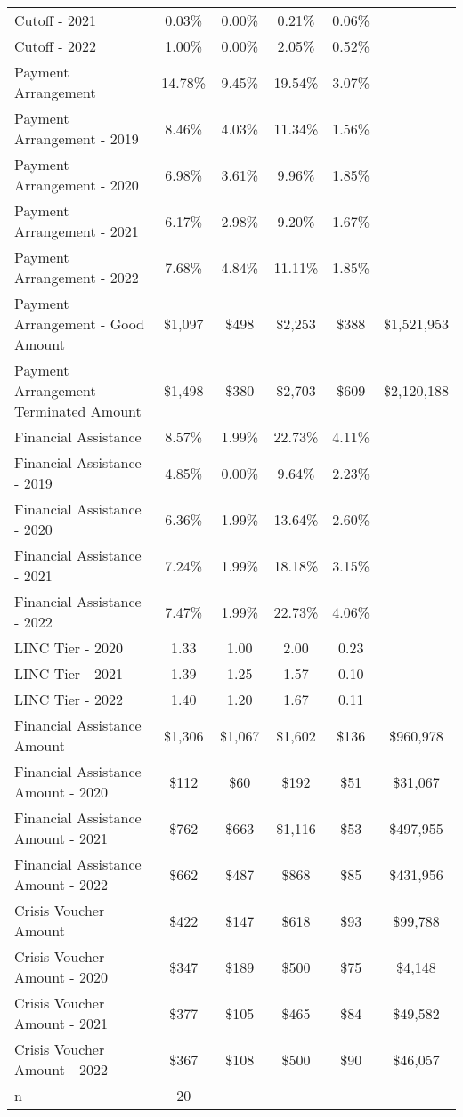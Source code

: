\begin{tabular}{l|c|c|c|c|c}
\quad Cutoff - 2021 & 0.03\% & 0.00\% & 0.21\% & 0.06\% \\
\quad Cutoff - 2022 & 1.00\% & 0.00\% & 2.05\% & 0.52\% \\
\midrule 
Payment Arrangement & 14.78\% & 9.45\% & 19.54\% & 3.07\% \\
\quad Payment Arrangement - 2019 & 8.46\% & 4.03\% & 11.34\% & 1.56\% \\
\quad Payment Arrangement - 2020 & 6.98\% & 3.61\% & 9.96\% & 1.85\% \\
\quad Payment Arrangement - 2021 & 6.17\% & 2.98\% & 9.20\% & 1.67\% \\
\quad Payment Arrangement - 2022 & 7.68\% & 4.84\% & 11.11\% & 1.85\% \\
\quad Payment Arrangement - Good Amount & \$1,097 & \$498 & \$2,253 & \$388 & \$1,521,953 \\
\quad Payment Arrangement - Terminated Amount & \$1,498 & \$380 & \$2,703 & \$609 & \$2,120,188 \\
\midrule 
Financial Assistance & 8.57\% & 1.99\% & 22.73\% & 4.11\% \\
\quad Financial Assistance - 2019 & 4.85\% & 0.00\% & 9.64\% & 2.23\% \\
\quad Financial Assistance - 2020 & 6.36\% & 1.99\% & 13.64\% & 2.60\% \\
\quad Financial Assistance - 2021 & 7.24\% & 1.99\% & 18.18\% & 3.15\% \\
\quad Financial Assistance - 2022 & 7.47\% & 1.99\% & 22.73\% & 4.06\% \\
\midrule 
LINC Tier - 2020 & 1.33 & 1.00 & 2.00 & 0.23 \\
LINC Tier - 2021 & 1.39 & 1.25 & 1.57 & 0.10 \\
LINC Tier - 2022 & 1.40 & 1.20 & 1.67 & 0.11 \\
\midrule 
Financial Assistance Amount & \$1,306 & \$1,067 & \$1,602 & \$136 & \$960,978 \\
\quad Financial Assistance Amount - 2020 & \$112 & \$60 & \$192 & \$51 & \$31,067 \\
\quad Financial Assistance Amount - 2021 & \$762 & \$663 & \$1,116 & \$53 & \$497,955 \\
\quad Financial Assistance Amount - 2022 & \$662 & \$487 & \$868 & \$85 & \$431,956 \\
\midrule 
Crisis Voucher Amount & \$422 & \$147 & \$618 & \$93 & \$99,788 \\
\quad Crisis Voucher Amount - 2020 & \$347 & \$189 & \$500 & \$75 & \$4,148 \\
\quad Crisis Voucher Amount - 2021 & \$377 & \$105 & \$465 & \$84 & \$49,582 \\
\quad Crisis Voucher Amount - 2022 & \$367 & \$108 & \$500 & \$90 & \$46,057 \\
\midrule 
n & 20 &  &  &  &  \\
\midrule 
\bottomrule 
\end{tabular}
